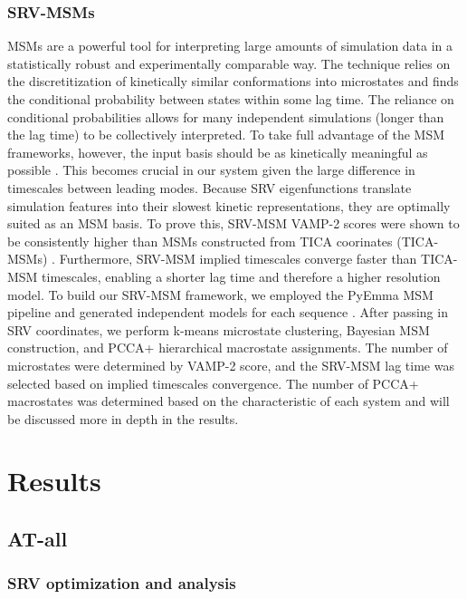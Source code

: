 \documentclass[journal=jpcbfk,manuscript=article]{achemso}
\begin{document}
\subsubsection{\label{sec:methods}SRV-MSMs}

MSMs are a powerful tool for interpreting large amounts of simulation data in a statistically robust and experimentally comparable way. The technique relies on the discretitization of kinetically similar conformations into microstates and finds the conditional probability between states within some lag time. The reliance on conditional probabilities allows for many independent simulations (longer than the lag time) to be collectively interpreted. To take full advantage of the MSM frameworks, however, the input basis should be as kinetically meaningful as possible \citep{Pande2010EverythingAsk}. This becomes crucial in our system given the large difference in timescales between leading modes. Because SRV eigenfunctions translate simulation features into their slowest kinetic representations, they are optimally suited as an MSM basis. To prove this, SRV-MSM VAMP-2 scores were shown to be consistently higher than MSMs constructed from TICA coorinates (TICA-MSMs) \citep{Sidky}. Furthermore, SRV-MSM implied timescales converge faster than TICA-MSM timescales, enabling a shorter lag time and therefore a higher resolution model. To build our SRV-MSM framework, we employed the PyEmma MSM pipeline and generated independent models for each sequence \citep{Scherer2015PyEMMAModels}. After passing in SRV coordinates, we perform k-means microstate clustering, Bayesian MSM construction, and PCCA+ hierarchical macrostate assignments. The number of microstates were determined by VAMP-2 score, and the SRV-MSM lag time was selected based on implied timescales convergence.  The number of PCCA+ macrostates was determined based on the characteristic of each system and will be discussed more in depth in the results. 


\section{\label{sec:Results}Results}

\subsection{AT-all}

\subsubsection{SRV optimization and analysis}
\end{document}
